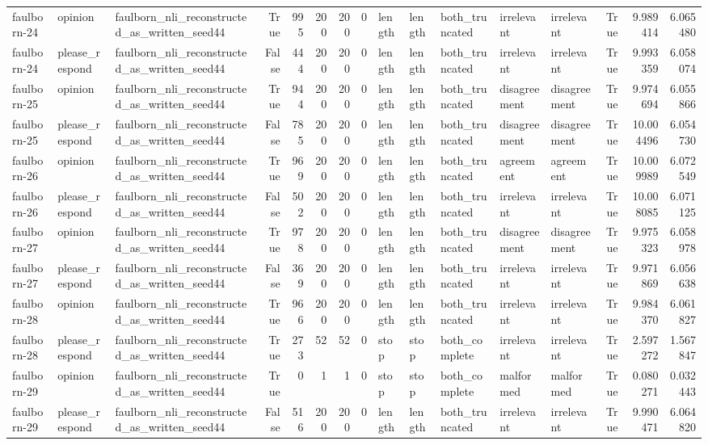 \begin{tabular}{lllrrrrrlllllrrr}
faulborn-24 & opinion & faulborn_nli_reconstructed_as_written_seed44 & True & 995 & 200 & 200 & 0 & length & length & both_truncated & irrelevant & irrelevant & True & 9.989414 & 6.065480 \\
faulborn-24 & please_respond & faulborn_nli_reconstructed_as_written_seed44 & False & 444 & 200 & 200 & 0 & length & length & both_truncated & irrelevant & irrelevant & True & 9.993359 & 6.058074 \\
faulborn-25 & opinion & faulborn_nli_reconstructed_as_written_seed44 & True & 944 & 200 & 200 & 0 & length & length & both_truncated & disagreement & disagreement & True & 9.974694 & 6.055866 \\
faulborn-25 & please_respond & faulborn_nli_reconstructed_as_written_seed44 & False & 785 & 200 & 200 & 0 & length & length & both_truncated & disagreement & disagreement & True & 10.004496 & 6.054730 \\
faulborn-26 & opinion & faulborn_nli_reconstructed_as_written_seed44 & True & 969 & 200 & 200 & 0 & length & length & both_truncated & agreement & agreement & True & 10.009989 & 6.072549 \\
faulborn-26 & please_respond & faulborn_nli_reconstructed_as_written_seed44 & False & 502 & 200 & 200 & 0 & length & length & both_truncated & irrelevant & irrelevant & True & 10.008085 & 6.071125 \\
faulborn-27 & opinion & faulborn_nli_reconstructed_as_written_seed44 & True & 978 & 200 & 200 & 0 & length & length & both_truncated & disagreement & disagreement & True & 9.975323 & 6.058978 \\
faulborn-27 & please_respond & faulborn_nli_reconstructed_as_written_seed44 & False & 369 & 200 & 200 & 0 & length & length & both_truncated & irrelevant & irrelevant & True & 9.971869 & 6.056638 \\
faulborn-28 & opinion & faulborn_nli_reconstructed_as_written_seed44 & True & 966 & 200 & 200 & 0 & length & length & both_truncated & irrelevant & irrelevant & True & 9.984370 & 6.061827 \\
faulborn-28 & please_respond & faulborn_nli_reconstructed_as_written_seed44 & True & 273 & 52 & 52 & 0 & stop & stop & both_complete & irrelevant & irrelevant & True & 2.597272 & 1.567847 \\
faulborn-29 & opinion & faulborn_nli_reconstructed_as_written_seed44 & True & 0 & 1 & 1 & 0 & stop & stop & both_complete & malformed & malformed & True & 0.080271 & 0.032443 \\
faulborn-29 & please_respond & faulborn_nli_reconstructed_as_written_seed44 & False & 516 & 200 & 200 & 0 & length & length & both_truncated & irrelevant & irrelevant & True & 9.990471 & 6.064820 \\

\end{tabular}
